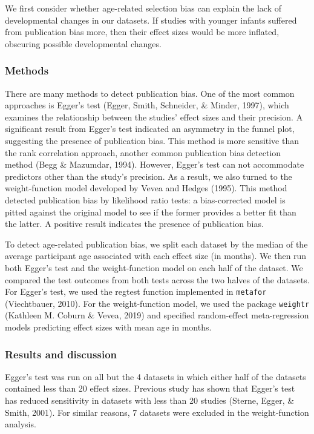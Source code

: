 \documentclass[
  man]{apa6}
\begin{document}
We first consider whether age-related selection bias can explain the lack of developmental changes in our datasets. If studies with younger infants suffered from publication bias more, then their effect sizes would be more inflated, obscuring possible developmental changes.

\hypertarget{methods-1}{%
\subsubsection{Methods}\label{methods-1}}

There are many methods to detect publication bias. One of the most common approaches is Egger's test (Egger, Smith, Schneider, \& Minder, 1997), which examines the relationship between the studies' effect sizes and their precision. A significant result from Egger's test indicated an asymmetry in the funnel plot, suggesting the presence of publication bias. This method is more sensitive than the rank correlation approach, another common publication bias detection method (Begg \& Mazumdar, 1994). However, Egger's test can not accommodate predictors other than the study's precision. As a result, we also turned to the weight-function model developed by Vevea and Hedges (1995). This method detected publication bias by likelihood ratio tests: a bias-corrected model is pitted against the original model to see if the former provides a better fit than the latter. A positive result indicates the presence of publication bias.

To detect age-related publication bias, we split each dataset by the median of the average participant age associated with each effect size (in months). We then run both Egger's test and the weight-function model on each half of the dataset. We compared the test outcomes from both tests across the two halves of the datasets. For Egger's test, we used the regtest function implemented in \texttt{metafor} (Viechtbauer, 2010). For the weight-function model, we used the package \texttt{weightr} (Kathleen M. Coburn \& Vevea, 2019) and specified random-effect meta-regression models predicting effect sizes with mean age in months.

\hypertarget{results-and-discussion}{%
\subsubsection{Results and discussion}\label{results-and-discussion}}

Egger's test was run on all but the 4 datasets in which either half of the datasets contained less than 20 effect sizes. Previous study has shown that Egger's test has reduced sensitivity in datasets with less than 20 studies (Sterne, Egger, \& Smith, 2001). For similar reasons, 7 datasets were excluded in the weight-function analysis.
\end{document}
